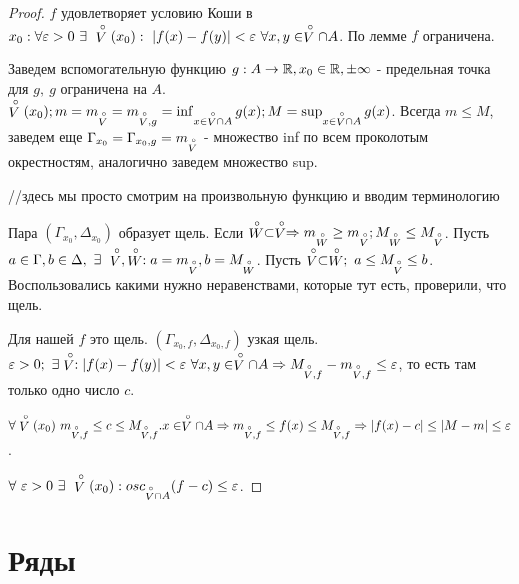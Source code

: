 \documentclass[12pt]{report}
\begin{document}
\begin{proof}
$f$ удовлетворяет условию Коши в $x_0: \forall \varepsilon > 0 ~\exists ~\stackrel \circ V(x_0): ~|f(x) - f(y)| < \varepsilon ~\forall x, y \in \stackrel \circ V\cap A$. По лемме $f$ ограничена. 

Заведем вспомогательную функцию $g: A \to \mathbb{R}, x_0 \in \mathbb{R}, \pm\infty$ - предельная точка для $g, ~g$ ограничена на $A$. $\stackrel \circ V(x_0); m = m_{\stackrel \circ V} = m_{\stackrel \circ V, g} = \inf_{x \in \stackrel \circ V \cap A}{g(x)}; M = \sup_{x \in \stackrel \circ V \cap A}{g(x)}$. Всегда $m \le M$, заведем еще $\Gamma_{x_0} = \Gamma_{x_0, g} = {m_{\stackrel \circ V}}$ - множество inf по всем проколотым окрестностям, аналогично заведем множество sup. 

//здесь мы просто смотрим на произвольную функцию и вводим терминологию

Пара $(\Gamma_{x_0}, \Delta_{x_0})$ образует щель. Если $\stackrel \circ W \subset \stackrel \circ V \Rightarrow m_{\stackrel \circ W} \ge m_{\stackrel \circ V}; M_{\stackrel \circ W} \le M_{\stackrel \circ V}$. Пусть $a \in \Gamma, b \in \Delta, ~\exists ~\stackrel \circ V, \stackrel \circ W: a = m_{\stackrel \circ V}, b = M_{\stackrel \circ W}$. Пусть $\stackrel \circ V  \subset \stackrel \circ W; ~a \le M_{\stackrel \circ V} \le b$. Воспользовались какими нужно неравенствами, которые тут есть, проверили, что щель.

Для нашей $f$ это щель. $(\Gamma_{x_0, f}, \Delta_{x_0, f})$ узкая щель. $\varepsilon > 0; ~\exists \stackrel \circ V: |f(x) - f(y)| < \varepsilon ~\forall x, y \in \stackrel \circ V \cap A \Rightarrow M_{\stackrel \circ V, f} - m_{\stackrel \circ V, f} \le \varepsilon$, то есть там только одно число $c$.

$\forall \stackrel \circ V(x_0) ~m_{\stackrel \circ V, f} \le c \le M_{\stackrel \circ V, f}. x \in \stackrel \circ V \cap A \Rightarrow m_{\stackrel \circ V, f} \le f(x) \le M_{\stackrel \circ V, f} \Rightarrow |f(x) - c| \le |M - m| \le \varepsilon$.

$\forall ~\varepsilon > 0 ~\exists ~\stackrel \circ V(x_0): osc_{\stackrel \circ V \cap A}(f - c) \le \varepsilon$.
\end{proof}
\section{Ряды}
\end{document}
